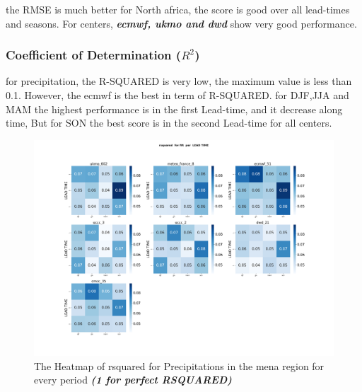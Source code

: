 the RMSE is much better for North africa, the score is good over all lead-times and seasons. For centers, \textbf{\textit{ecmwf, ukmo and dwd}} show very good performance.


\subsubsection{Coefficient of Determination (\( R^2 \))}
for precipitation, the R-SQUARED is very low, the maximum value is less than 0.1. However, the ecmwf is the best in term of R-SQUARED. for DJF,JJA and MAM the highest performance is in the first Lead-time, and it decrease along time, But for SON the best score is in the second Lead-time for all centers.
\begin{figure}[H]
	\centering
	\includegraphics[scale=0.25]{plots/det/rsquared/rsquared_RR_mena.png}
	\caption{The Heatmap of rsquared for Precipitations in the mena region for every period \textbf{\textit{(1 for perfect RSQUARED)} }}
\end{figure}


